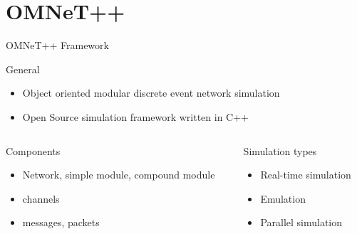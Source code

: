 \section{OMNeT++}

\begin{frame}{OMNeT++ Framework}
    \begin{block}{General}
        \begin{itemize}
            \item Object oriented modular discrete event network simulation
            \item Open Source simulation framework written in C++
        \end{itemize}
    \end{block}
    \begin{columns}
        \begin{column}{0.5\textwidth}
            \begin{block}{Components}
                \begin{itemize}
                    \item Network, simple module, compound module
                    \item channels
                    \item messages, packets
                \end{itemize}
            \end{block}
        \end{column}
        \begin{column}{0.5\textwidth}
            \begin{block}{Simulation types}
                \begin{itemize}
                    \item Real-time simulation
                    \item Emulation
                    \item Parallel simulation
                \end{itemize}
            \end{block}
        \end{column}
    \end{columns}
\end{frame}